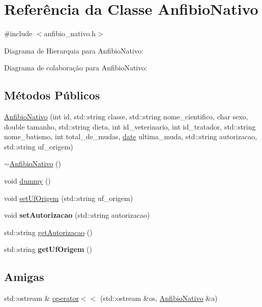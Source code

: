 \hypertarget{classAnfibioNativo}{}\section{Referência da Classe Anfibio\+Nativo}
\label{classAnfibioNativo}


{\ttfamily \#include $<$anfibio\+\_\+nativo.\+h$>$}



Diagrama de Hierarquia para Anfibio\+Nativo\+:


Diagrama de colaboração para Anfibio\+Nativo\+:
\subsection*{Métodos Públicos}
\begin{DoxyCompactItemize}
\item 
\hyperlink{classAnfibioNativo_a91cf2d5da4dc6fb39d63098a82ccc94a}{Anfibio\+Nativo} (int id, std\+::string classe, std\+::string nome\+\_\+cientifico, char sexo, double tamanho, std\+::string dieta, int id\+\_\+veterinario, int id\+\_\+tratador, std\+::string nome\+\_\+batismo, int total\+\_\+de\+\_\+mudas, \hyperlink{classdate}{date} ultima\+\_\+muda, std\+::string autorizacao, std\+::string uf\+\_\+origem)
\item 
\hyperlink{classAnfibioNativo_a10ecde482410d669995fd852ba150d75}{$\sim$\+Anfibio\+Nativo} ()
\item 
void \hyperlink{classAnfibioNativo_ace45796a9ce43d12b992182643aeb94e}{dummy} ()
\item 
void \hyperlink{classAnfibioNativo_abe331a3871d097e8f272da09d81ca629}{set\+Uf\+Origem} (std\+::string uf\+\_\+origem)
\item 
\mbox{\label{classAnfibioNativo_a69550548cd8d5aad1547668121f9c3a1}} 
void {\bfseries set\+Autorizacao} (std\+::string autorizacao)
\item 
std\+::string \hyperlink{classAnfibioNativo_ac49d89e944f29ee3584741382b6378d8}{get\+Autorizacao} ()
\item 
\mbox{\label{classAnfibioNativo_a0e3fe901d3b17349beaf77d37d0681ad}} 
std\+::string {\bfseries get\+Uf\+Origem} ()
\end{DoxyCompactItemize}
\subsection*{Amigas}
\begin{DoxyCompactItemize}
\item 
std\+::ostream \& \hyperlink{classAnfibioNativo_aa32bce187158a3ef855d1cb0229268a7}{operator$<$$<$} (std\+::ostream \&os, \hyperlink{classAnfibioNativo}{Anfibio\+Nativo} \&a)
\end{DoxyCompactItemize}
